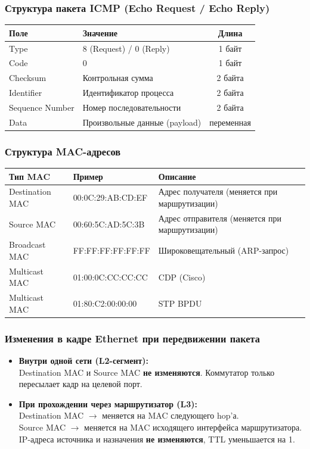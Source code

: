 \begin{enumerate}
\subsubsection*{Структура пакета ICMP (Echo Request / Echo Reply)}
\begin{center}
\begin{tabular}{|l|l|c|}
\hline
\textbf{Поле} & \textbf{Значение} & \textbf{Длина} \\
\hline
Type & 8 (Request) / 0 (Reply) & 1 байт \\
Code & 0 & 1 байт \\
Checksum & Контрольная сумма & 2 байта \\
Identifier & Идентификатор процесса & 2 байта \\
Sequence Number & Номер последовательности & 2 байта \\
Data & Произвольные данные (payload) & переменная \\
\hline
\end{tabular}
\end{center}

\subsubsection*{Структура MAC-адресов}
\begin{center}
\begin{tabular}{|l|l|l|}
\hline
\textbf{Тип MAC} & \textbf{Пример} & \textbf{Описание} \\
\hline
Destination MAC & 00:0C:29:AB:CD:EF & Адрес получателя (меняется при маршрутизации) \\
Source MAC & 00:60:5C:AD:5C:3B & Адрес отправителя (меняется при маршрутизации) \\
Broadcast MAC & FF:FF:FF:FF:FF:FF & Широковещательный (ARP-запрос) \\
Multicast MAC & 01:00:0C:CC:CC:CC & CDP (Cisco) \\
Multicast MAC & 01:80:C2:00:00:00 & STP BPDU \\
\hline
\end{tabular}
\end{center}

\subsubsection*{Изменения в кадре Ethernet при передвижении пакета}
\begin{itemize}
    \item \textbf{Внутри одной сети (L2-сегмент):} \\
    Destination MAC и Source MAC \textbf{не изменяются}. Коммутатор только пересылает кадр на целевой порт.
    \item \textbf{При прохождении через маршрутизатор (L3):} \\
    Destination MAC $\rightarrow$ меняется на MAC следующего hop'а. \\
    Source MAC $\rightarrow$ меняется на MAC исходящего интерфейса маршрутизатора. \\
    IP-адреса источника и назначения \textbf{не изменяются}, TTL уменьшается на 1.
\end{itemize}


\end{enumerate}
